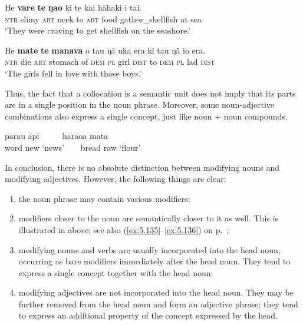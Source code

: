 \ea\label{ex:5.110}
\gll He \textbf{vare} \textbf{te} \textbf{ŋao} ki te kai hāhaki {\ꞌ}i tai.\\
\textsc{ntr} slimy \textsc{art} neck to \textsc{art} food gather\_shellfish at sea\\

\glt 
‘They were craving to get shellfish on the seashore.’ \textstyleExampleref{[Mtx-7-30.043]}
\z

\ea\label{ex:5.111}
\gll He \textbf{mate} \textbf{te} \textbf{manava} o tau ŋā uka era ki tau ŋā io era.\\
\textsc{ntr} die \textsc{art} stomach of \textsc{dem} \textsc{pl} girl \textsc{dist} to \textsc{dem} \textsc{pl} lad \textsc{dist}\\

\glt
‘The girls fell in love with those boys.’ \textstyleExampleref{[Mtx-6-03.079]}
\z

Thus, the fact that a collocation is a semantic unit does not imply that its parts are in a single position in the noun phrase. Moreover, some noun-adjective combinations also express a single concept, just like noun + noun compounds.

\ea\label{ex:5.112}
\gll parau{\rmfnm} {\ꞌ}āpī ~ ~ ~ haraoa mata \\
word new ‘news’ ~ ~ bread raw ‘flour’\\
\z
{}

In conclusion, there is no absolute distinction between modifying nouns and modifying adjectives. However, the following things are clear:

\begin{enumerate}
\item 
the noun phrase may contain various modifiers;

\item 
modifiers closer to the noun are semantically closer to it as well. This is illustrated in  above; see also (\ref{ex:5.135}–\ref{ex:5.136}) on p.~\pageref{ex:5.135};

\item 
modifying nouns and verbs are usually incorporated into the head noun, occurring as bare modifiers immediately after the head noun. They tend to express a single concept together with the head noun;

\item 
modifying adjectives are not incorporated into the head noun. They may be further removed from the head noun and form an adjective phrase; they tend to express an additional property of the concept expressed by the head. 

\end{enumerate}

